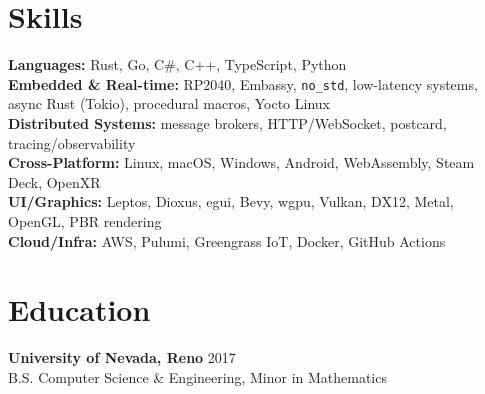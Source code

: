 \documentclass[11pt,letterpaper]{article}
\begin{document}
\section*{Skills}

\textbf{Languages:} Rust, Go, C\#, C++, TypeScript, Python \\
\textbf{Embedded \& Real-time:} RP2040, Embassy, \texttt{no\_std}, low-latency systems, async Rust (Tokio), procedural macros, Yocto Linux \\
\textbf{Distributed Systems:} message brokers, HTTP/WebSocket, postcard, tracing/observability \\
\textbf{Cross-Platform:} Linux, macOS, Windows, Android, WebAssembly, Steam Deck, OpenXR \\
\textbf{UI/Graphics:} Leptos, Dioxus, egui, Bevy, wgpu, Vulkan, DX12, Metal, OpenGL, PBR rendering \\
\textbf{Cloud/Infra:} AWS, Pulumi, Greengrass IoT, Docker, GitHub Actions

\section*{Education}

\textbf{University of Nevada, Reno} \hfill 2017 \\
B.S. Computer Science \& Engineering, Minor in Mathematics
\end{document}
